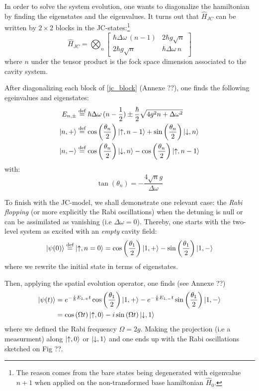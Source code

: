 \documentclass[12pt]{report}
\DeclarePairedDelimiter\ket{\lvert}{\rangle}
\begin{document}
In order to solve the system evolution, one wants to diagonalize the hamiltonian by finding the eigenstates and the eigenvalues. It turns out that $\hat{H}_{JC}$ can be written by $2\times 2$ blocks in the JC-states:\footnote{The reason comes from the bare states being degenerated with eigenvalue $n+1$ when applied on the non-transformed base hamiltonian $\hat{H}_0$.}
\begin{equation}
\label{jc_block}
\hat{H}_{JC} = \bigotimes_n \begin{bmatrix}
\hbar \Delta\omega \, (n-1) & 2\hbar g \sqrt{n}\\
2\hbar g \sqrt{n} & \hbar \Delta\omega \, n
\end{bmatrix}
\end{equation}
where $n$ under the tensor product is the fock space dimension associated to the cavity system.

After diagonalizing each block of \eqref{jc_block} (Annexe ??), one finds the following egeinvalues and eigenstates:
\begin{align}
E_{n, \pm} &\stackrel{\text{def}}{=} \hbar\Delta\omega\,(n-\frac{1}{2}) \pm \frac{\hbar}{2}\sqrt{4g^2n + \Delta\omega ^2}\\
\ket{n, +} &\stackrel{\text{def}}{=} \cos\left(\frac{\theta_n}{2}\right) \ket{\uparrow, n - 1}  + \sin\left(\frac{\theta_n}{2}\right) \ket{\downarrow, n}\\
\ket{n, -} &\stackrel{\text{def}}{=} \cos\left(\frac{\theta_n}{2}\right) \ket{\downarrow, n}  - \cos\left(\frac{\theta_n}{2}\right) \ket{\uparrow, n - 1}
\end{align}
with:
\begin{equation}
\tan\left(\theta_n\right) = -\frac{4\sqrt{n}g}{\Delta\omega}
\end{equation}

To finish with the JC-model, we shall demonstrate one relevant case: the \textit{Rabi flopping} (or more explicitly the Rabi oscillations) when the detuning is null or can be assimilated as vanishing (i.e $\Delta\omega = 0$). Thereby, one starts with the two-level system as excited with an \textit{empty} cavity field:
\begin{equation}
\ket{\psi(0)} \stackrel{\text{def}}{=} \ket{\uparrow, n = 0} = \cos\left(\frac{\theta_{1}}{2}\right) \ket{1, +} - \sin\left(\frac{\theta_{1}}{2}\right) \ket{1, -}
\end{equation}
where we rewrite the initial state in terms of eigenstates.

Then, applying the spatial evolution operator, one finds (see Annexe ??)
\begin{align}
\ket{\psi(t)} &= e^{-\frac{i}{\hbar}E_{1,+}t} \cos\left(\frac{\theta_{1}}{2}\right) \ket{1, +} - e^{-\frac{i}{\hbar}E_{1,-}t} \sin\left(\frac{\theta_{1}}{2}\right) \ket{1, -}\\
&= \cos\left(\Omega t\right) \ket{\uparrow, 0} - i \sin\left(\Omega t\right) \ket{\downarrow, 1}
\end{align}
where we defined the Rabi frequency $\Omega = 2g$. Making the projection (i.e a measurment) along $\ket{\uparrow, 0}$ or $\ket{\downarrow, 1}$ and one ends up with the Rabi oscillations sketched on Fig ??.
\end{document}
